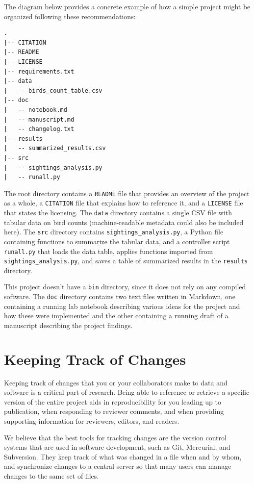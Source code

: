 \documentclass[10pt,letterpaper]{article}
\newcommand{\practicesection}[2]{\section{#1}\label{#2}}
\begin{document}
The diagram below provides a concrete example of how a
simple project might be organized following these recommendations:

{\small
\begin{verbatim}
.
|-- CITATION
|-- README
|-- LICENSE
|-- requirements.txt
|-- data
|   -- birds_count_table.csv
|-- doc
|   -- notebook.md
|   -- manuscript.md
|   -- changelog.txt
|-- results
|   -- summarized_results.csv
|-- src
|   -- sightings_analysis.py
|   -- runall.py
\end{verbatim}
}

The root directory contains a \texttt{README} file that provides an
overview of the project as a whole, a \texttt{CITATION} file that
explains how to reference it, and a \texttt{LICENSE} file that states the
licensing. The \texttt{data} directory contains a
single CSV file with tabular data on bird counts (machine-readable
metadata could also be included here). The \texttt{src} directory
contains \texttt{sightings\_analysis.py}, a Python file containing
functions to summarize the tabular data, and a controller script
\texttt{runall.py} that loads the data table, applies functions
imported from \texttt{sightings\_analysis.py}, and saves a table of
summarized results in the \texttt{results} directory.

This project doesn't have a \texttt{bin} directory, since it does not
rely on any compiled software. The \texttt{doc} directory contains two
text files written in Markdown, one containing a running lab notebook
describing various ideas for the project and how these were
implemented and the other containing a running draft of a manuscript
describing the project findings.

\practicesection{Keeping Track of Changes}{sec:versioning}

Keeping track of changes that you or your collaborators make to data
and software is a critical part of research. Being able to reference or
retrieve a specific version of the entire project aids in reproducibility
for you leading up to publication, when responding to reviewer comments,
and when providing supporting information for reviewers, editors,
and readers.

We believe that the best tools for tracking changes are the version
control systems that are used in software development, such as Git,
Mercurial, and Subversion. They keep track of what was changed in a
file when and by whom, and synchronize changes to a central server so
that many users can manage changes to the same set of files.
\end{document}

